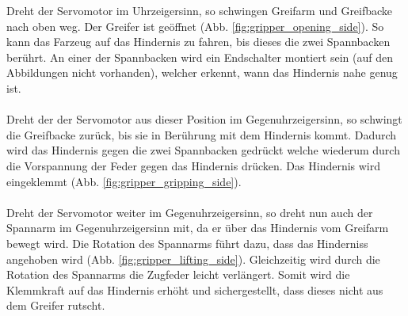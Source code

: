 Dreht der Servomotor im Uhrzeigersinn, so schwingen Greifarm und Greifbacke nach oben weg. Der Greifer ist geöffnet (Abb. \ref{fig:gripper_opening_side}). So kann das Farzeug auf das Hindernis zu fahren, bis dieses die zwei Spannbacken berührt. An einer der Spannbacken wird ein Endschalter montiert sein (auf den Abbildungen nicht vorhanden), welcher erkennt, wann das Hindernis nahe genug ist.\\
\\
Dreht der der Servomotor aus dieser Position im Gegenuhrzeigersinn, so schwingt die Greifbacke zurück, bis sie in Berührung mit dem Hindernis kommt. Dadurch wird das Hindernis gegen die zwei Spannbacken gedrückt welche wiederum durch die Vorspannung der Feder gegen das Hindernis drücken. Das Hindernis wird eingeklemmt (Abb. \ref{fig:gripper_gripping_side}).\\
\\
Dreht der Servomotor weiter im Gegenuhrzeigersinn, so dreht nun auch der Spannarm im Gegenuhrzeigersinn mit, da er über das Hindernis vom Greifarm bewegt wird. Die Rotation des Spannarms führt dazu, dass das Hinderniss angehoben wird (Abb. \ref{fig:gripper_lifting_side}). Gleichzeitig wird durch die Rotation des Spannarms die Zugfeder leicht verlängert. Somit wird die Klemmkraft auf das Hindernis erhöht und sichergestellt, dass dieses nicht aus dem Greifer rutscht.

